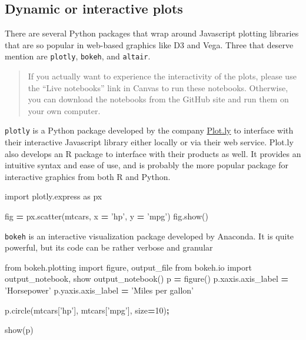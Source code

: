 \documentclass[
  letterpaper,
]{scrbook}
\newenvironment{Shaded}{\begin{snugshade}}{\end{snugshade}}
\newcommand{\DecValTok}[1]{\textcolor[rgb]{0.00,0.00,0.81}{#1}}
\newcommand{\ImportTok}[1]{#1}
\newcommand{\NormalTok}[1]{#1}
\newcommand{\OperatorTok}[1]{\textcolor[rgb]{0.81,0.36,0.00}{\textbf{#1}}}
\newcommand{\StringTok}[1]{\textcolor[rgb]{0.31,0.60,0.02}{#1}}
\begin{document}
\hypertarget{dynamic-or-interactive-plots}{%
\subsection{Dynamic or interactive plots}\label{dynamic-or-interactive-plots}}

There are several Python packages that wrap around Javascript plotting libraries that are so popular in web-based graphics like D3 and Vega. Three that deserve mention are \texttt{plotly}, \texttt{bokeh}, and \texttt{altair}.

\begin{quote}
If you actually want to experience the interactivity of the plots, please use the ``Live notebooks'' link in Canvas to run these notebooks. Otherwise, you can download the notebooks from the GitHub site and run them on your own computer.
\end{quote}

\texttt{plotly} is a Python package developed by the company \href{https://www.plotly.com}{Plot.ly} to interface with their interactive Javascript library either locally or via their web service. Plot.ly also develops an R package to interface with their products as well. It provides an intuitive syntax and ease of use, and is probably the more popular package for interactive graphics from both R and Python.

\begin{Shaded}
\begin{Highlighting}[]
\ImportTok{import}\NormalTok{ plotly.express }\ImportTok{as}\NormalTok{ px}

\NormalTok{fig }\OperatorTok{=}\NormalTok{ px.scatter(mtcars, x }\OperatorTok{=} \StringTok{'hp'}\NormalTok{, y }\OperatorTok{=} \StringTok{'mpg'}\NormalTok{)}
\NormalTok{fig.show()}
\end{Highlighting}
\end{Shaded}

\texttt{bokeh} is an interactive visualization package developed by Anaconda. It is quite powerful, but its code can be rather verbose and granular

\begin{Shaded}
\begin{Highlighting}[]
\ImportTok{from}\NormalTok{ bokeh.plotting }\ImportTok{import}\NormalTok{ figure, output_file}
\ImportTok{from}\NormalTok{ bokeh.io }\ImportTok{import}\NormalTok{ output_notebook, show}
\NormalTok{output_notebook()}
\NormalTok{p }\OperatorTok{=}\NormalTok{ figure()}
\NormalTok{p.xaxis.axis_label }\OperatorTok{=} \StringTok{'Horsepower'}
\NormalTok{p.yaxis.axis_label }\OperatorTok{=} \StringTok{'Miles per gallon'}

\NormalTok{p.circle(mtcars[}\StringTok{'hp'}\NormalTok{], mtcars[}\StringTok{'mpg'}\NormalTok{], size}\OperatorTok{=}\DecValTok{10}\NormalTok{)}\OperatorTok{;}

\NormalTok{show(p)}
\end{Highlighting}
\end{Shaded}
\end{document}
